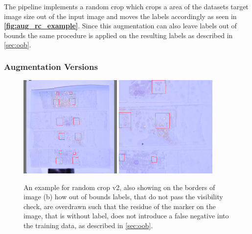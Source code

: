 \documentclass[10pt]{book}
\newcommand{\figureref}[1]{\textbf{\autoref{#1}}}
\begin{document}
The pipeline implements a random crop which crops a area of the datasets target image size out of the input image and moves the labels accordingly as seen in \figureref{fig:aug_rc_example}. Since this augmentation can also leave labels out of bounds the same procedure is applied on the resulting labels as described in \autoref{sec:oob}.

\subsubsection{Augmentation Versions}

\begin{figure}
  \centering
     {\includegraphics[width=0.45\textwidth]{image/aug_rc2_before}}
     {\includegraphics[width=0.45\textwidth]{image/aug_rc2_after}}
  \caption{An example for random crop v2, also showing on the borders of image (b) how out of bounds labels, that do not pass the visibility check, are overdrawn such that the residue of the marker on the image, that is without label, does not introduce a false negative into the training data, as described in \autoref{sec:oob}.}
  \label{fig:aug_rc2_example}
\end{figure}
\end{document}
